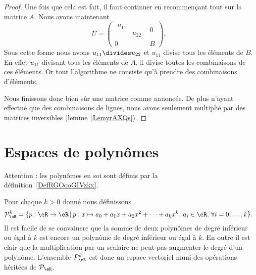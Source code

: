 \begin{proof}
    Une fois que cela est fait, il faut continuer en recommençant tout sur la matrice \( A\). Nous avons maintenant
    \begin{equation}
        U=\begin{pmatrix}
            \begin{matrix}
                u_{11}  &       \\
                &   u_{22}
            \end{matrix}&   0    \\
            0    &   B
        \end{pmatrix}.
    \end{equation}
    Sous cette forme nous avons \( u_{11}\divides u_{22}\) et \( u_{11}\) divise tous les éléments de \( B\). En effet \( u_{11}\) divisant tous les éléments de \( A\), il divise toutes les combinaisons de ces éléments. Or tout l'algorithme ne consiste qu'à prendre des combinaisons d'éléments.

    Nous finissons donc bien sûr une matrice comme annoncée. De plus n'ayant effectué que des combinaisons de lignes, nous avons seulement multiplié par des matrices inversibles (lemme~\ref{LemyrAXQs}).
\end{proof}



\section{Espaces de polynômes}
\label{SecEspacePolynomes}

Attention : les polynômes en soi sont définis par la définition~\ref{DefRGOooGIVzkx}.

Pour chaque $k>0$ donné nous définissons
\begin{equation}
\mathcal{P}_\eR^k=\{p:\eR\to \eR\,|\, p : x\mapsto a_0+a_1 x +a_2 x^2 + \cdots+a_k x^k, \, a_i\in\eR,\,\forall i=0,\ldots,k\}.
\end{equation}
Il est facile de se convaincre que la somme de deux polynômes de degré inférieur ou égal à $k$ est encore un polynôme de degré inférieur ou égal à $k$. En outre il est clair que la multiplication par un scalaire ne peut pas augmenter le degré d'un polynôme. L'ensemble $\mathcal{P}_\eR^k$ est donc un espace vectoriel muni des opérations héritées de $\mathcal{P}_{\eR}$.


